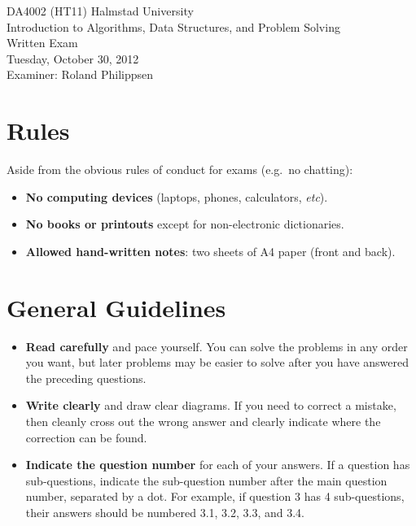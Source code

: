\documentclass[a4paper]{article}
\newcounter{question}
\begin{document}
\pagestyle{empty}
\thispagestyle{empty}



\noindent
\begin{minipage}{\columnwidth}
  \centering
  \Large
  DA4002 (HT11) Halmstad University\\
  Introduction to Algorithms, Data Structures, and Problem Solving\\[3\baselineskip]
  \Huge
  Written Exam\\
  \Large
  Tuesday, October 30, 2012\\[2\baselineskip]
  Examiner: Roland Philippsen
\end{minipage}

\vfill

\noindent
\begin{center}
\end{center}

\vfill



\section*{Rules}

Aside from the obvious rules of conduct for exams (e.g.\ no chatting):

\begin{itemize}
\item
  \textbf{No computing devices} (laptops, phones, calculators, \emph{etc}).
\item
  \textbf{No books or printouts} except for non-electronic dictionaries.
\item
  \textbf{Allowed hand-written notes}: two sheets of A4 paper (front and back).
\end{itemize}



\section*{General Guidelines}

\begin{itemize}
\item
  \textbf{Read carefully} and pace yourself.
  You can solve the problems in any order you want, but later problems may be easier to solve after you have answered the preceding questions.
\item
  \textbf{Write clearly} and draw clear diagrams.
  If you need to correct a mistake, then cleanly cross out the wrong answer and clearly indicate where the correction can be found.
\item
  \textbf{Indicate the question number} for each of your answers.
  If a question has sub-questions, indicate the sub-question number after the main question number, separated by a dot.
  For example, if question 3 has 4 sub-questions, their answers should be numbered 3.1, 3.2, 3.3, and 3.4.
\end{itemize}
\end{document}

